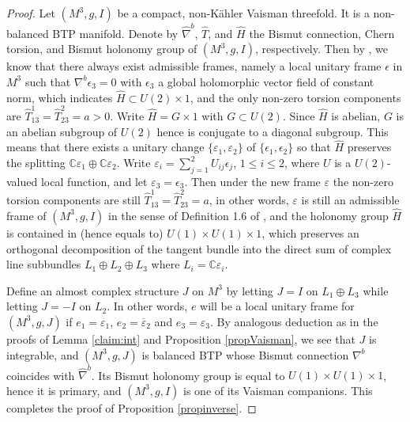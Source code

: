 \documentclass{amsart}
\numberwithin{equation}{section}
\theoremstyle{definition}
\renewcommand{\1}{\mathds{1}}
\renewcommand{\>}{\rightarrow}
\begin{document}
\begin{proof}
Let $(M^3,g,I)$ be a compact, non-K\"ahler Vaisman threefold. It is a non-balanced BTP manifold. Denote by $\hat{\nabla}^b$, $\hat{T}$, and $\hat{H}$ the Bismut connection, Chern torsion, and Bismut holonomy group of $(M^3,g,I)$, respectively. Then by \cite[Proposition 1.7]{ZhaoZ24}, we know that there always exist admissible frames, namely a local unitary frame $\epsilon $ in $M^3$ such that
$\nabla^b\epsilon_3=0$ with $\epsilon_3$ a global holomorphic vector field of constant norm, which indicates $\hat{H} \subset U(2)\times 1$, and the only non-zero torsion components are $\hat{T}^1_{13}=\hat{T}^2_{23}=a>0$. Write $\hat{H}=G\!\times\!1$ with $G\subset U(2)$. Since $\hat{H}$ is abelian, $G$ is an abelian subgroup of $U(2)$ hence is conjugate to a diagonal subgroup. This means that there exists a unitary change $\{ \varepsilon_1, \varepsilon_2\}$ of $\{ \epsilon_1, \epsilon_2\}$ so that $\hat{H}$ preserves the splitting ${\mathbb C}\varepsilon_1 \oplus {\mathbb C}\varepsilon_2$. Write $\varepsilon_i=\sum_{j=1}^2 U_{ij}\epsilon_j$, $1\leq i\leq 2$, where $U$ is a $U(2)$-valued local function, and let $\varepsilon_3=\epsilon_3$. Then under the new frame $\varepsilon$ the non-zero torsion components are still $\hat{T}^1_{13}=\hat{T}^2_{23}=a$, in other words, $\varepsilon$ is still an admissible frame of $(M^3,g,I)$ in the sense of Definition 1.6 of \cite{ZhaoZ24}, and the holonomy group $\hat{H}$ is contained in (hence equals to) $U(1)\!\times\!U(1)\!\times\!1$, which preserves an orthogonal decomposition of the tangent bundle into the direct sum of complex line subbundles $L_1\oplus L_2\oplus L_3$ where $L_i={\mathbb C}\varepsilon_i$.

Define an almost complex structure $J$ on $M^3$ by letting $J=I$ on $L_1\oplus L_3$ while letting $J=-I$ on $L_2$. In other words, $e$ will be  a local unitary frame for $(M^3,g,J)$ if $e_1=\varepsilon_1$, $e_2=\overline{\varepsilon}_2$ and $e_3=\varepsilon_3$. By analogous deduction as in the proofs of Lemma \ref{claim:int} and Proposition \ref{propVaisman}, we see that $J$ is integrable, and $(M^3,g,J)$ is balanced BTP whose Bismut connection $\nabla^b$ coincides with $\hat{\nabla}^b$. Its Bismut holonomy group is equal to $U(1)\!\times\!U(1)\!\times\!1$, hence it is primary, and $(M^3,g,I)$ is one of its Vaisman companions. This completes the proof of Proposition \ref{propinverse}.
\end{proof}


\end{document}
